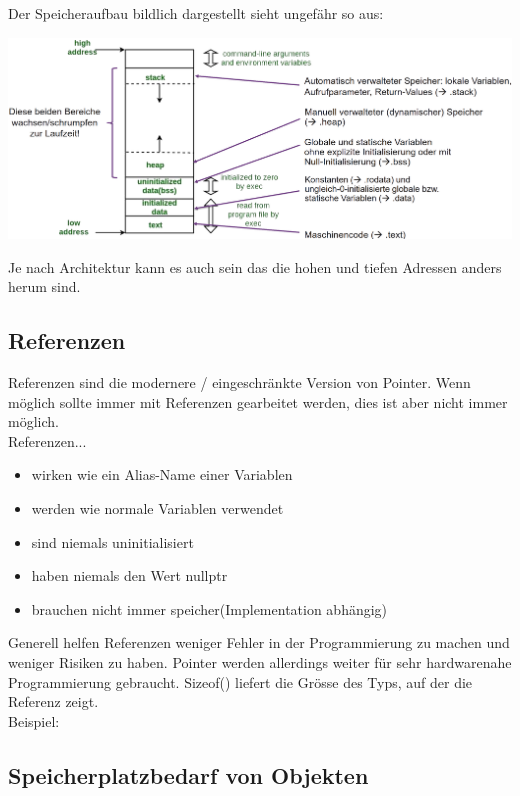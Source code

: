 Der Speicheraufbau bildlich dargestellt sieht ungefähr so aus:

\begin{center}
    \includegraphics[width=\columnwidth]{pictures/memorylayout.png}  
\end{center}

Je nach Architektur kann es auch sein das die hohen und tiefen Adressen anders herum sind.

\subsection{Referenzen}

Referenzen sind die modernere / eingeschränkte Version von Pointer. 
Wenn möglich sollte immer mit Referenzen gearbeitet werden, dies ist aber nicht immer möglich.\\

Referenzen...
\begin{itemize}[itemsep=1pt, parsep=0pt]
    \item wirken wie ein Alias-Name einer Variablen
    \item werden wie normale Variablen verwendet
    \item sind niemals uninitialisiert
    \item haben niemals den Wert nullptr
    \item brauchen nicht immer speicher(Implementation abhängig)
\end{itemize}

Generell helfen Referenzen weniger Fehler in der Programmierung zu machen und weniger Risiken zu haben. 
Pointer werden allerdings weiter für sehr hardwarenahe Programmierung gebraucht. 
Sizeof() liefert die Grösse des Typs, auf der die Referenz zeigt.\\
Beispiel:




\subsection{Speicherplatzbedarf von Objekten}

